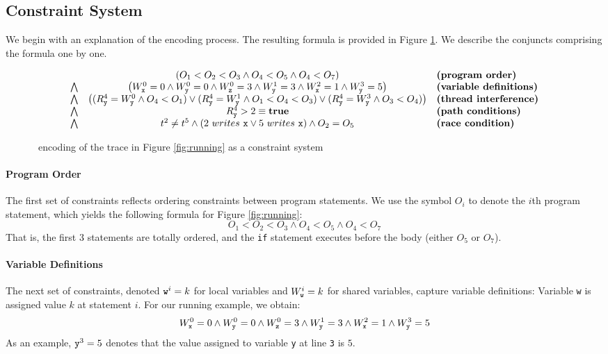 \subsection{Constraint System}

We begin with an explanation of the encoding process. The resulting formula is provided in Figure \ref{fig:encoding}. We describe the conjuncts comprising the formula one by one.

\begin{figure*}
	\begin{center}
$$
	\begin{array}{rcl}
	& \left( O_1 < O_2 < O_3 \wedge O_4 < O_5 \wedge O_4 < O_7 \right) & \textbf{(program order)} \\
\bigwedge & \left( W_{\tt x}^0 = 0 \wedge W_{\tt y}^0 = 0 \wedge W_{\tt z}^0 = 3 \wedge W_{\tt y}^1 = 3 \wedge 
	W_{\tt x}^2 = 1 \wedge W_{\tt y}^3 = 5 \right) & \textbf{(variable definitions)} \\
\bigwedge & \left(		(R_{\tt y}^4=W_{\tt y}^0 \wedge O_4 < O_1) \vee	
(R_{\tt y}^4=W_{\tt y}^1 \wedge O_1 < O_4 < O_3) \vee
(R_{\tt y}^4=W_{\tt y}^3 \wedge O_3 < O_4)
		\right) & \textbf{(thread interference)} \\
\bigwedge & R_{\tt y}^4 > 2 \equiv {\bf true} & \textbf{(path conditions)} \\
\bigwedge & t^2 \neq t^5 \wedge (2\ writes\ {\tt x} \vee 5\ writes\ {\tt x}) \wedge O_2 = O_5 & \textbf{(race condition)}
	\end{array} 
$$
\end{center}
\caption{\label{fig:encoding}\tool\ encoding of the trace in Figure \ref{fig:running} as a constraint system}
\end{figure*}

\paragraph{Program Order} The first set of constraints reflects ordering constraints between program statements. We use the symbol $O_i$ to denote the $i$th program statement, which yields the following formula for Figure \ref{fig:running}:
$$
	O_1 < O_2 < O_3 \wedge O_4 < O_5 \wedge O_4 < O_7
$$
That is, the first 3 statements are totally ordered, and the {\tt if} statement executes before the body (either $O_5$ or $O_7$).

\paragraph{Variable Definitions} The next set of constraints, denoted ${\tt w}^i=k$ for local variables and $W_{\tt w}^i=k$ for shared variables, capture variable definitions: Variable {\tt w} is assigned value $k$ at statement $i$. For our running example, we obtain:
$$
	W_{\tt x}^0 = 0 \wedge W_{\tt y}^0 = 0 \wedge W_{\tt z}^0 = 3 \wedge W_{\tt y}^1 = 3 \wedge
			W_{\tt x}^2 = 1 \wedge W_{\tt y}^3 = 5
$$
As an example, ${\tt y}^3 = 5$ denotes that the value assigned to variable {\tt y} 
at line {\tt 3} is $5$.

